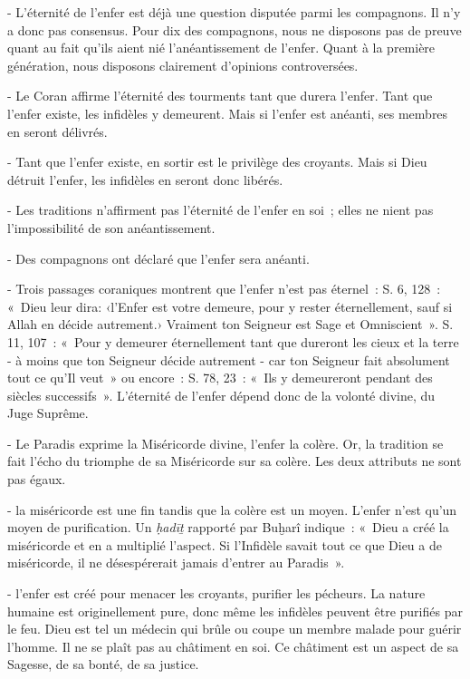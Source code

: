 - L'éternité de l'enfer est déjà une question disputée parmi les
compagnons. Il n'y a donc pas consensus. Pour dix des compagnons, nous
ne disposons pas de preuve quant au fait qu'ils aient nié
l'anéantissement de l'enfer. Quant à la première génération, nous
disposons clairement d'opinions controversées.

- Le Coran affirme l'éternité des tourments tant que durera l'enfer.
Tant que l'enfer existe, les infidèles y demeurent. Mais si l'enfer est
anéanti, ses membres en seront délivrés.

- Tant que l'enfer existe, en sortir est le privilège des croyants. Mais
si Dieu détruit l'enfer, les infidèles en seront donc libérés.

- Les traditions n'affirment pas l'éternité de l'enfer en soi~; elles ne
nient pas l'impossibilité de son anéantissement.

- Des compagnons ont déclaré que l'enfer sera anéanti.

- Trois passages coraniques montrent que l'enfer n'est pas éternel~: S.
6, 128~: «~Dieu leur dira: ‹l'Enfer est votre demeure, pour y rester
éternellement, sauf si Allah en décide autrement.› Vraiment ton Seigneur
est Sage et Omniscient~». S. 11, 107~: «~Pour y demeurer éternellement
tant que dureront les cieux et la terre - à moins que ton Seigneur
décide autrement - car ton Seigneur fait absolument tout ce qu'Il veut~»
ou encore~: S. 78, 23~: «~Ils y demeureront pendant des siècles
successifs~». L'éternité de l'enfer dépend donc de la volonté divine, du
Juge Suprême.

- Le Paradis exprime la Miséricorde divine, l'enfer la colère. Or, la
tradition se fait l'écho du triomphe de sa Miséricorde sur sa colère.
Les deux attributs ne sont pas égaux.

- la miséricorde est une fin tandis que la colère est un moyen. L'enfer
n'est qu'un moyen de purification. Un \emph{ḥadīṯ} rapporté par Buḫarî
indique~: «~Dieu a créé la miséricorde et en a multiplié l'aspect. Si
l'Infidèle savait tout ce que Dieu a de miséricorde, il ne désespérerait
jamais d'entrer au Paradis~»\sn{}.

- l'enfer est créé pour menacer les croyants, purifier les pécheurs. La
nature humaine est originellement pure, donc même les infidèles peuvent
être purifiés par le feu. Dieu est tel un médecin qui brûle ou coupe un
membre malade pour guérir l'homme. Il ne se plaît pas au châtiment en
soi. Ce châtiment est un aspect de sa Sagesse, de sa bonté, de sa
justice.

